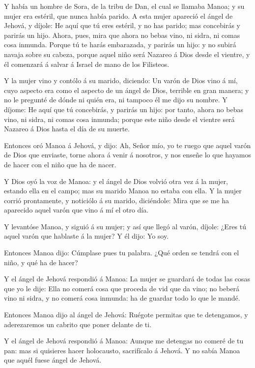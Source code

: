  Y había un hombre de Sora, de la tribu de Dan, el cual se
llamaba Manoa; y su mujer era estéril, que nunca había parido.
 A esta mujer apareció el ángel de Jehová, y díjole: He aquí
que tú eres estéril, y no has parido; mas concebirás y parirás un hijo.
 Ahora, pues, mira que ahora no bebas vino, ni sidra, ni
comas cosa inmunda.  Porque tú te harás embarazada, y
parirás un hijo: y no subirá navaja sobre su cabeza, porque aquel niño
será Nazareo á Dios desde el vientre, y él comenzará á salvar á Israel
de mano de los Filisteos.

 Y la mujer vino y contólo á su marido, diciendo: Un varón
de Dios vino á mí, cuyo aspecto era como el aspecto de un ángel de Dios,
terrible en gran manera; y no le pregunté de dónde ni quién era, ni
tampoco él me dijo su nombre.  Y díjome: He aquí que tú
concebirás, y parirás un hijo: por tanto, ahora no bebas vino, ni sidra,
ni comas cosa inmunda; porque este niño desde el vientre será Nazareo á
Dios hasta el día de su muerte.

 Entonces oró Manoa á Jehová, y dijo: Ah, Señor mío, yo te
ruego que aquel varón de Dios que enviaste, torne ahora á venir á
nosotros, y nos enseñe lo que hayamos de hacer con el niño que ha de
nacer.

 Y Dios oyó la voz de Manoa: y el ángel de Dios volvió otra
vez á la mujer, estando ella en el campo; mas su marido Manoa no estaba
con ella.  Y la mujer corrió prontamente, y noticiólo á su
marido, diciéndole: Mira que se me ha aparecido aquel varón que vino á
mí el otro día.

 Y levantóse Manoa, y siguió á su mujer; y así que llegó al
varón, díjole: ¿Eres tú aquel varón que hablaste á la mujer? Y él dijo:
Yo soy.

 Entonces Manoa dijo: Cúmplase pues tu palabra. ¿Qué orden
se tendrá con el niño, y qué ha de hacer?

 Y el ángel de Jehová respondió á Manoa: La mujer se
guardará de todas las cosas que yo le dije:  Ella no comerá
cosa que proceda de vid que da vino; no beberá vino ni sidra, y no
comerá cosa inmunda: ha de guardar todo lo que le mandé.

 Entonces Manoa dijo al ángel de Jehová: Ruégote permitas
que te detengamos, y aderezaremos un cabrito que poner delante de ti.

 Y el ángel de Jehová respondió á Manoa: Aunque me detengas
no comeré de tu pan: mas si quisieres hacer holocausto, sacrifícalo á
Jehová. Y no sabía Manoa que aquél fuese ángel de Jehová.

